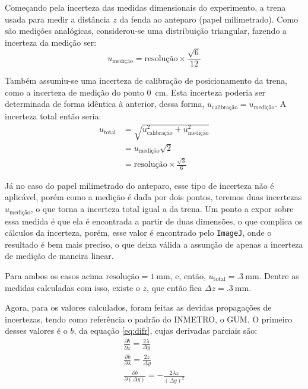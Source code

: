 Começando pela incerteza das medidas dimensionais do experimento, a trena usada para medir a distância $z$ da fenda ao anteparo (papel milimetrado). Como são medições analógicas, considerou-se uma distribuição triangular, fazendo a incerteza da medição ser:
\begin{equation*}
    u_\text{medição} = \text{resolução} \times \frac{\sqrt{6}}{12}
\end{equation*}

Também assumiu-se uma incerteza de calibração de posicionamento da trena, como a incerteza de medição do ponto \SI{0}{\centi\meter}. Esta incerteza poderia ser determinada de forma idêntica à anterior, dessa forma, $u_\text{calibração} = u_\text{medição}$. A incerteza total então seria:
\begin{align*}
    u_\text{total}
        &= \sqrt{u_\text{calibração}^2 + u_\text{medição}^2} \\
        &= u_\text{medição} \sqrt{2} \\
        &= \text{resolução} \times \frac{\sqrt{3}}{6}
\end{align*}

Já no caso do papel milimetrado do anteparo, esse tipo de incerteza não é aplicável, porém como a medição é dada por dois pontos, teremos duas incertezas $u_\text{medição}$, o que torna a incerteza total igual a da trena. Um ponto a expor sobre essa medida é que ela é encontrada a partir de duas dimensões, o que complica os cálculos da incerteza, porém, esse valor é encontrado pelo \texttt{ImageJ}\cite{ref:imagej}, onde o resultado é bem mais preciso, o que deixa válida a assunção de apenas a incerteza de medição de maneira linear.

Para ambos os casos acima $\text{resolução} = \SI{1}{\milli\meter}$, e, então, $u_\text{total} = \SI{.3}{\milli\meter}$. Dentre as medidas calculadas com isso, existe o $z$, que então fica $\Delta z = \SI{.3}{\milli\meter}$.

Agora, para os valores calculados, foram feitas as devidas propagações de incertezas, tendo como referência o padrão do INMETRO, o GUM\cite{ref:gum}. O primeiro desses valores é o $b$, da equação \ref{eq:difr}, cujas derivadas parciais são:
\begin{gather*}
    \frac{\partial b}{\partial z} = \frac{2 \lambda}{\Delta y} \\
    \frac{\partial b}{\partial \lambda} = \frac{2 z}{\Delta y} \\
    \frac{\partial b}{\partial (\Delta y)} = -\frac{2 \lambda z}{(\Delta y)^2}
\end{gather*}

